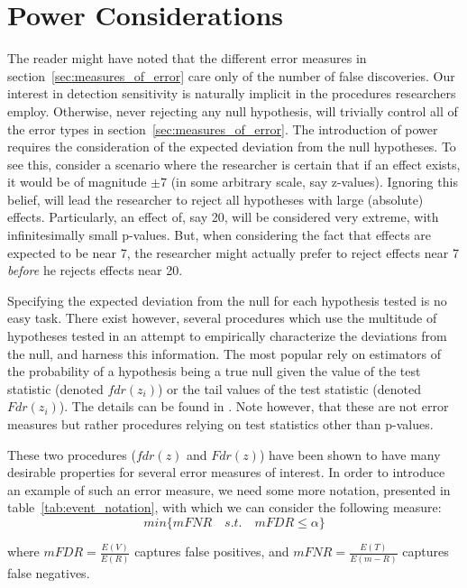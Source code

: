 \documentclass[draft,12pt]{article}
\begin{document}
\section{Power Considerations}
The reader might have noted that the different error measures in section~\ref{sec:measures_of_error} care only of the number of false discoveries. Our interest in detection sensitivity is naturally implicit in the procedures researchers employ. Otherwise, never rejecting any null hypothesis, will trivially control all of the error types in section~\ref{sec:measures_of_error}. 
The introduction of power requires the consideration of the expected deviation from the null hypotheses. To see this, consider a scenario where the researcher is certain that if an effect exists, it would be of magnitude $\pm7$ (in some arbitrary scale, say z-values). Ignoring this belief, will lead the researcher to reject all hypotheses with large (absolute) effects. Particularly, an effect of, say 20,  will be considered very extreme, with infinitesimally small p-values. But, when considering the fact that effects are expected to be near 7, the researcher might actually prefer to reject effects near 7 \emph{before} he rejects effects near 20. 

Specifying the expected deviation from the null for each hypothesis tested is no easy task. There exist however, several procedures which use the multitude of hypotheses tested in an attempt to empirically characterize the deviations from the null, and harness this information. The most popular rely on estimators of the probability of a hypothesis being a true null given the value of the test statistic (denoted $fdr(z_i)$) or the tail values of the test statistic (denoted $Fdr(z_i)$). The details can be found in \cite{efron_microarrays_2008}. Note however, that these are not error measures but rather procedures relying on test statistics other than p-values.  

These two procedures ($fdr(z)$ and $Fdr(z)$) have been shown to have many desirable properties for several error measures of interest. In order to introduce an example of such an error measure, we need some more notation, presented in table~\ref{tab:event_notation}, with which we can consider the following measure:
\begin{equation} \label{eq:compound_error}
min\{mFNR \quad s.t. \quad mFDR\leq \alpha \}
\end{equation}

where $mFDR=\frac{E(V)}{E(R)}$ captures false positives, and 
$mFNR=\frac{E(T)}{E(m-R)}$ captures false negatives.
\end{document}
